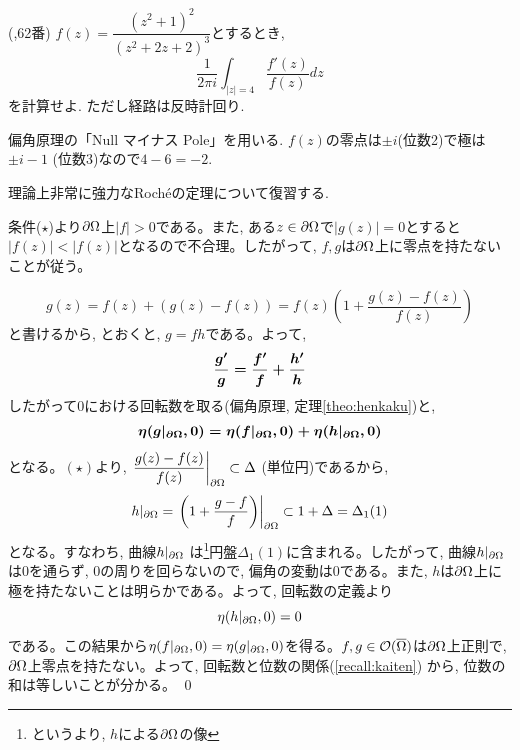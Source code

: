 \begin{egprob} (\cite{mag},62番)
$f(z) = \dfrac{(z^2+1)^2}{(z^2+2z+2)^3}$とするとき,
\[\dfrac{1}{2\pi i} \int_{|z|=4} \dfrac{f'(z)}{f(z)}dz\]
を計算せよ. ただし経路は反時計回り.
\end{egprob}

\begin{egans}
偏角原理の「Null マイナス Pole」を用いる. $f(z)$の零点は$\pm i$(位数2)で極は$\pm i - 1$ (位数3)なので$4- 6 = -2$.
\end{egans}


理論上非常に強力なRoch\'{e}の定理について復習する.

\begin{point}
\end{point}

\prf


条件($\star$)より$\partial \Omega$上$|f| > 0$である。また, ある$z\in \partial \Omega$で$|g(z)| = 0$とすると$|f(z)|<|f(z)|$となるので不合理。したがって, $f,g$は$\partial \Omega$上に零点を持たないことが従う。\par
\[g(z)=f(z)+(g(z)-f(z))=f(z)\left(1+\dfrac{g(z)-f(z)}{f(z)}\right)\]
と書けるから, とおくと, $g=fh$である。よって,
\[{\mbox{\boldmath $\dfrac{g'}{g}=\dfrac{f'}{f}+\dfrac{h'}{h}$}}\]
したがって$0$における回転数を取る(偏角原理, 定理\ref{theo:henkaku})と,
\[{\mbox{\boldmath $\eta(g|_{\partial\Omega}, 0)=\eta(f|_{\partial\Omega}, 0)+\eta(h|_{\partial\Omega}, 0)$}}\]
となる。$(\star)$より, $\left.\dfrac{g(z)-f(z)}{f(z)}\right|_{\partial\Omega}\subset \Delta$ (単位円)であるから,
\[h|_{\partial\Omega}=\left.\left(1+\dfrac{g-f}{f}\right)\right|_{\partial\Omega}\subset 1+\Delta =\Delta_1(1)\]
となる。すなわち, 曲線$h|_{\partial\Omega}$ は\footnote{というより, $h$による$\partial \Omega$の像}円盤$\Delta_1(1)$に含まれる。したがって, 曲線$h|_{\partial\Omega}$は$0$を通らず, $0$の周りを回らないので, 偏角の変動は0である。また, $h$は$\partial \Omega$上に極を持たないことは明らかである。よって, 回転数の定義より
\[\eta(h|_{\partial\Omega},0)=0\]
である。この結果から$\eta(f|_{\partial\Omega},0)=\eta(g|_{\partial\Omega},0)$を得る。$f,g\in \mathcal{O}(\overline{\Omega})$は$\partial \Omega$上正則で, $\partial \Omega$上零点を持たない。よって, 回転数と位数の関係(\ref{recall:kaiten}) から, 位数の和は等しいことが分かる。
\qed

